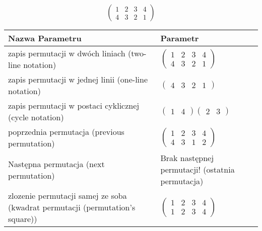 \documentclass[12pt]{article}
\begin{document}
\subsection{}
\begin{center}
\[
\begin{pmatrix}
	1 & 2 & 3 & 4 \\ 
	4 & 3 & 2 & 1 
\end{pmatrix}
\]

\begin{tabular}{|m{0.6\linewidth}|m{0.4\linewidth}|}
	\hline
	Nazwa Parametru & Parametr \\
	\hline
	zapis permutacji w dwóch liniach (two-line notation) & $\begin{pmatrix} 1 & 2 & 3 & 4 \\ 
4 & 3 & 2 & 1 \end{pmatrix}$ \\ 
	\hline
	zapis permutacji w jednej linii (one-line notation) & $\begin{pmatrix} 4 & 3 & 2 & 1 \end{pmatrix}$ \\ 
	\hline
	zapis permutacji w postaci cyklicznej (cycle notation) & $\begin{pmatrix} 1 & 4 \end{pmatrix} \begin{pmatrix} 2 & 3 \end{pmatrix} $ \\ 
	\hline
	poprzednia permutacja (previous permutation) & $\begin{pmatrix} 1 & 2 & 3 & 4 \\ 
4 & 3 & 1 & 2 \end{pmatrix}$ \\ 
	\hline
	Następna permutacja (next permutation) & Brak następnej permutacji! (ostatnia permutacja)\\ 
	\hline
	zlozenie permutacji samej ze soba (kwadrat permutacji (permutation's square)) & $\begin{pmatrix} 1 & 2 & 3 & 4 \\ 
1 & 2 & 3 & 4 \end{pmatrix}$ \\ 
	\hline
\end{tabular}
\end{center}
\end{document}
